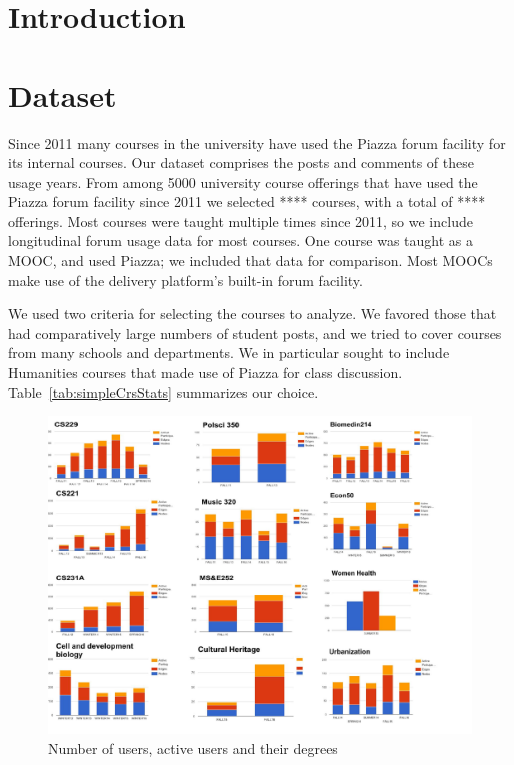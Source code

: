 \section{Introduction}

\section{Dataset}

Since 2011 many courses in the university have used the Piazza forum
facility for its internal courses. Our dataset comprises the posts and
comments of these usage years. From among 5000 university course
offerings that have used the Piazza forum facility since 2011 we
selected **** courses, with a total of **** offerings. Most courses
were taught multiple times since 2011, so we include longitudinal
forum usage data for most courses. One course was taught as a MOOC,
and used Piazza; we included that data for comparison. Most MOOCs make
use of the delivery platform's built-in forum facility.

We used two criteria for selecting the courses to analyze. We favored
those that had comparatively large numbers of student posts, and we
tried to cover courses from many schools and departments. We in
particular sought to include Humanities courses that made use of
 Piazza for class discussion. Table~\ref{tab:simpleCrsStats} summarizes
 our choice.
 
 \begin{figure}[htp]
       \centering
       \includegraphics[width=1.2\textwidth]{Figs/nodes2.pdf}
       \caption{\textnormal{Number of users, active users and their degrees}}
       \label{fig:graphExpl}
\end{figure}
 
